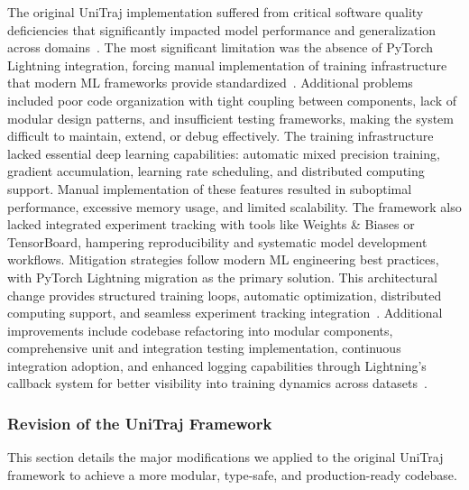 The original UniTraj implementation suffered from critical software quality deficiencies that significantly impacted model performance and generalization across domains~\cite{metadriveLi2022}. The most significant limitation was the absence of PyTorch Lightning integration, forcing manual implementation of training infrastructure that modern ML frameworks provide standardized~\cite{falcon2019pytorch}. Additional problems included poor code organization with tight coupling between components, lack of modular design patterns, and insufficient testing frameworks, making the system difficult to maintain, extend, or debug effectively.
The training infrastructure lacked essential deep learning capabilities: automatic mixed precision training, gradient accumulation, learning rate scheduling, and distributed computing support. Manual implementation of these features resulted in suboptimal performance, excessive memory usage, and limited scalability. The framework also lacked integrated experiment tracking with tools like Weights \& Biases or TensorBoard, hampering reproducibility and systematic model development workflows.
Mitigation strategies follow modern ML engineering best practices, with PyTorch Lightning migration as the primary solution. This architectural change provides structured training loops, automatic optimization, distributed computing support, and seamless experiment tracking integration~\cite{falcon2019pytorch}. Additional improvements include codebase refactoring into modular components, comprehensive unit and integration testing implementation, continuous integration adoption, and enhanced logging capabilities through Lightning's callback system for better visibility into training dynamics across datasets~\cite{unitrajFeng2024, scenarionetLi2023}.


\subsubsection{Revision of the UniTraj Framework}
This section details the major modifications we applied to the original UniTraj framework to achieve a more modular, type-safe, and production-ready codebase.

